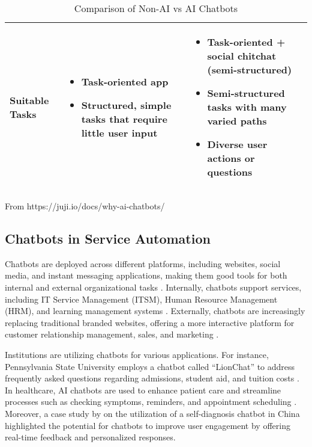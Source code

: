 \begin{table}[ht]
\begin{adjustbox}{max width=\textwidth}
\begin{tabular}{|p{3.3cm}|l|l|}
			\hline
			\textbf{Suitable Tasks} &
			\begin{minipage}[t]{0.4\textwidth}
				\begin{itemize}
					\item Task-oriented app
					\item Structured, simple tasks that require little user input
				\end{itemize}
			\end{minipage} &
			\begin{minipage}[t]{0.4\textwidth}
				\begin{itemize}
					\item Task-oriented + social chitchat (semi-structured)
					\item Semi-structured tasks with many varied paths
					\item Diverse user actions or questions
				\end{itemize}
			\end{minipage} \\
			\hline
		\end{tabular}
	\end{adjustbox}
	\caption{Comparison of Non-AI vs AI Chatbots}
	From https://juji.io/docs/why-ai-chatbots/
	\label{Tab: chatbot_comparison}
\end{table}

\subsection{Chatbots in Service Automation}

Chatbots are deployed across different platforms, including websites, social media, and instant messaging applications, making them good tools for both internal and external organizational tasks \cite{hagberg2016, zarouali2018}. Internally, chatbots support services, including IT Service Management (ITSM), Human Resource Management (HRM), and learning management systems \cite{nawaz2019, bakouan2018}. Externally, chatbots are increasingly replacing traditional branded websites, offering a more interactive platform for customer relationship management, sales, and marketing \cite{broeck2019}.

Institutions are utilizing chatbots for various applications. For instance, Pennsylvania State University employs a chatbot called “LionChat” to address frequently asked questions regarding admissions, student aid, and tuition costs \cite{Pennstate}. In healthcare, AI chatbots are used to enhance patient care and streamline processes such as checking symptoms, reminders, and appointment scheduling \cite{altamimi2023}. Moreover, a case study by \cite{fan2021} on the utilization of a self-diagnosis chatbot in China highlighted the potential for chatbots to improve user engagement by offering real-time feedback and personalized responses.

